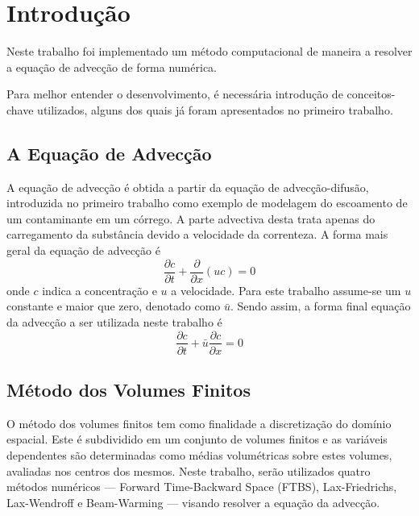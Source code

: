 \chapter{Introdução}
Neste trabalho foi implementado um método computacional de maneira a resolver
a equação de advecção de forma numérica.

Para melhor entender o desenvolvimento, é necessária introdução de
conceitos-chave utilizados, alguns dos quais já foram apresentados no primeiro
trabalho.

\section{A Equação de Advecção}
A equação de advecção é obtida a partir da equação de advecção-difusão,
introduzida no primeiro trabalho como exemplo de modelagem do escoamento de um
contaminante em um córrego. A parte advectiva desta trata apenas do
carregamento da substância devido a velocidade da correnteza. A forma mais
geral da equação de advecção é
\begin{equation}
    \frac{\partial c}{\partial t} + \frac{\partial}{\partial x}(uc) = 0
\end{equation}
onde $c$ indica a concentração e $u$ a velocidade. Para este trabalho
assume-se um $u$ constante e maior que zero, denotado como $\bar{u}$. Sendo
assim, a forma final equação da advecção a ser utilizada neste trabalho é
\begin{equation}\label{adv}
    \frac{\partial c}{\partial t} + \bar{u}\frac{\partial c}{\partial x} = 0
\end{equation}

\section{Método dos Volumes Finitos}
O método dos volumes finitos tem como finalidade a discretização do domínio
espacial. Este é subdividido em um conjunto de volumes finitos e as variáveis
dependentes são determinadas como médias volumétricas sobre estes volumes,
avaliadas nos centros dos mesmos. Neste trabalho, serão utilizados quatro
métodos numéricos --- Forward Time-Backward Space (FTBS), Lax-Friedrichs,
Lax-Wendroff e Beam-Warming --- visando resolver a equação da advecção.